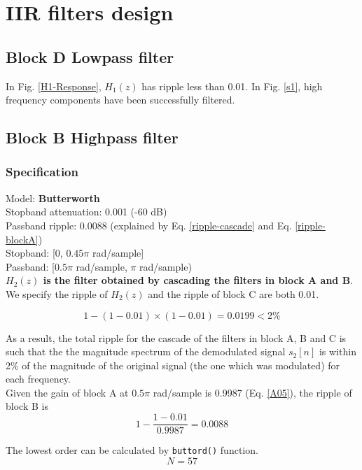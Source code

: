 \documentclass{article}
\newenvironment{homeworkProblem}[1]{
	\section{#1}
	}{
}
\newenvironment{homeworkSection}[1]{
	\subsection{#1}
	}{
}
\begin{document}
\begin{homeworkProblem}{IIR filters design}
\begin{homeworkSection}{Block D Lowpass filter}
In Fig. \ref{H1-Response}, $H_1(z)$ has ripple less than 0.01. In Fig. \ref{s1}, high frequency components have been successfully filtered.

\end{homeworkSection}


\begin{homeworkSection}{Block B Highpass filter}

\subsubsection{Specification}
Model: \textbf{Butterworth}\\
Stopband attenuation: 0.001 (-60 dB)\\
Passband ripple: 0.0088 (explained by Eq. \ref{ripple-cascade} and Eq. \ref{ripple-blockA})\\
Stopband: [0, $0.45\pi$ rad/sample]\\
Passband: [$0.5\pi$ rad/sample, $\pi$ rad/sample)\\

\textbf{$H_2(z)$ is the filter obtained by cascading the filters in block A and B}.\\

We specify the ripple of $H_2(z)$ and the ripple of block C are both 0.01.

\begin{equation}\label{ripple-cascade}
1 - (1-0.01) \times (1-0.01) = 0.0199 < 2\%
\end{equation}

As a result, the total ripple for the cascade of the filters in block A, B and C is such that the the magnitude spectrum of the demodulated signal $s_2[n]$ is within 2\% of the magnitude of the original signal (the one which was modulated) for each frequency.\\

Given the gain of block A at $0.5\pi$ rad/sample is 0.9987 (Eq. \ref{A05}), the ripple of block B is
\begin{equation}\label{ripple-blockA}
1 - \frac{1 - 0.01}{0.9987} = 0.0088
\end{equation}

The lowest order can be calculated by \texttt{buttord()} function.
\begin{equation}
N = 57
\end{equation}



\end{homeworkSection}
\end{homeworkProblem}
\end{document}
